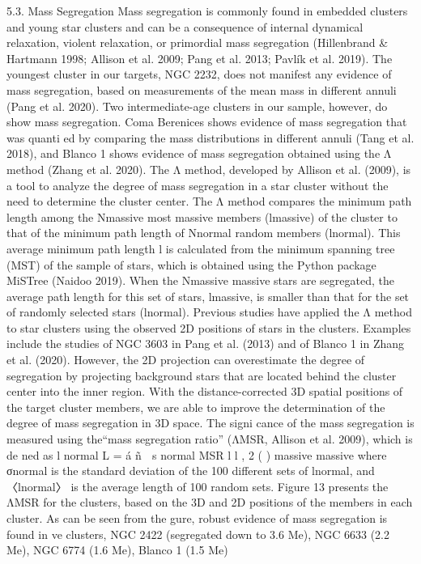 \documentclass[../main.tex]{subfiles}
\begin{document}
{%

5.3. Mass Segregation
Mass segregation is commonly found in embedded clusters
and young star clusters and can be a consequence of internal
dynamical relaxation, violent relaxation, or primordial mass
segregation (Hillenbrand & Hartmann 1998; Allison et al.
2009; Pang et al. 2013; Pavlík et al. 2019). The youngest
cluster in our targets, NGC 2232, does not manifest any
evidence of mass segregation, based on measurements of the
mean mass in different annuli (Pang et al. 2020). Two
intermediate-age clusters in our sample, however, do show
mass segregation. Coma Berenices shows evidence of mass
segregation that was quanti ed by comparing the mass
distributions in different annuli (Tang et al. 2018), and
Blanco 1 shows evidence of mass segregation obtained using
the Λ method (Zhang et al. 2020).
The Λ method, developed by Allison et al. (2009), is a tool
to analyze the degree of mass segregation in a star cluster
without the need to determine the cluster center. The Λ method
compares the minimum path length among the Nmassive most
massive members (lmassive) of the cluster to that of the
minimum path length of Nnormal random members (lnormal).
This average minimum path length l is calculated from the
minimum spanning tree (MST) of the sample of stars, which is
obtained using the Python package MiSTree (Naidoo 2019).
When the Nmassive massive stars are segregated, the average
path length for this set of stars, lmassive, is smaller than that for
the set of randomly selected stars (lnormal).
Previous studies have applied the Λ method to star clusters
using the observed 2D positions of stars in the clusters.
Examples include the studies of NGC 3603 in Pang et al.
(2013) and of Blanco 1 in Zhang et al. (2020). However, the 2D
projection can overestimate the degree of segregation by
projecting background stars that are located behind the cluster
center into the inner region. With the distance-corrected 3D
spatial positions of the target cluster members, we are able to
improve the determination of the degree of mass segregation in
3D space. The signi cance of the mass segregation is measured
using the“mass segregation ratio” (ΛMSR, Allison et al. 2009),
which is de ned as
l
normal
L = á ñ 
s
normal
MSR
l l , 2
( )
massive
massive
where σnormal is the standard deviation of the 100 different sets
of lnormal, and 〈lnormal〉 is the average length of 100 random sets.
Figure 13 presents the ΛMSR for the clusters, based on the 3D
and 2D positions of the members in each cluster. As can be
seen from the gure, robust evidence of mass segregation is
found in ve clusters, NGC 2422 (segregated down to 3.6 Me),
NGC 6633 (2.2 Me), NGC 6774 (1.6 Me), Blanco 1 (1.5 Me)

}
\end{document}
